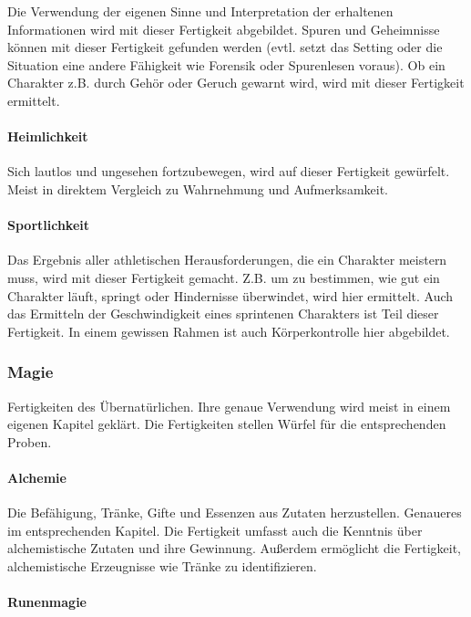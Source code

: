 \documentclass{article}
\begin{document}
Die Verwendung der eigenen Sinne und Interpretation der erhaltenen Informationen wird mit dieser Fertigkeit abgebildet.
Spuren und Geheimnisse können mit dieser Fertigkeit gefunden werden (evtl. setzt das Setting oder die Situation eine
andere Fähigkeit wie Forensik oder Spurenlesen voraus). Ob ein Charakter z.B. durch Gehör oder Geruch gewarnt wird,
wird mit dieser Fertigkeit ermittelt.

\paragraph{Heimlichkeit}

Sich lautlos und ungesehen fortzubewegen, wird auf dieser Fertigkeit gewürfelt. Meist in direktem Vergleich zu
Wahrnehmung und Aufmerksamkeit.

\paragraph{Sportlichkeit}

Das Ergebnis aller athletischen Herausforderungen, die ein Charakter meistern muss, wird mit dieser Fertigkeit gemacht.
Z.B. um zu bestimmen, wie gut ein Charakter läuft, springt oder Hindernisse überwindet, wird hier ermittelt. Auch das
Ermitteln der Geschwindigkeit eines sprintenen Charakters ist Teil dieser Fertigkeit. In einem gewissen Rahmen ist auch
Körperkontrolle hier abgebildet.


\subsubsection{Magie}

Fertigkeiten des Übernatürlichen. Ihre genaue Verwendung wird meist in einem eigenen Kapitel geklärt. Die
Fertigkeiten stellen Würfel für die entsprechenden Proben.

\paragraph{Alchemie}

Die Befähigung, Tränke, Gifte und Essenzen aus Zutaten herzustellen. Genaueres im entsprechenden Kapitel. Die Fertigkeit
umfasst auch die Kenntnis über alchemistische Zutaten und ihre Gewinnung. Außerdem ermöglicht die Fertigkeit,
alchemistische Erzeugnisse wie Tränke zu identifizieren.

\paragraph{Runenmagie}
\end{document}
